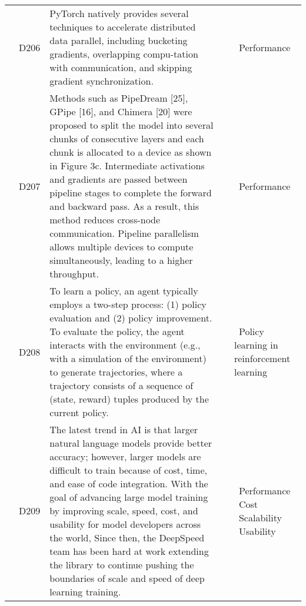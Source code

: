 {\begin{longtable}{|l|p{0.6cm}|p{11.8cm}|p{0.6cm}|p{2cm}|}
         & \label{D206}D206\newline\centering\cite{li_pytorch_2020} & PyTorch natively provides several techniques to accelerate distributed data parallel, including bucketing gradients, overlapping compu-tation with communication, and skipping gradient synchronization.
         & \cite{li_pytorch_2020,li_colossal-ai_2023,rasley_deepspeed_2020,shoeybi_megatron-lm_2020}
	     & \textbullet\ Performance \\ \cline{2-5}

         & \label{D207}D207\newline\centering\cite{li_colossal-ai_2023} & Methods such as PipeDream [25], GPipe [16], and Chimera [20] were proposed to split the model into several chunks of consecutive layers and each chunk is allocated to a device as shown in Figure 3c. Intermediate activations and gradients are passed between pipeline stages to complete the forward and backward pass. As a result, this method reduces cross-node communication. Pipeline parallelism allows multiple devices to compute simultaneously, leading to a higher throughput.
         & \cite{li_pytorch_2020,li_colossal-ai_2023,rasley_deepspeed_2020,shoeybi_megatron-lm_2020}
	     & \textbullet\ Performance \\ \cline{2-5}

         & \label{D208}D208\newline\centering\cite{moritz_ray_2018} & To learn a policy, an agent typically employs a two-step process: (1) policy evaluation and (2) policy improvement. To evaluate the policy, the agent interacts with the environment (e.g., with a simulation of the environment) to generate trajectories, where a trajectory consists of a sequence of (state, reward) tuples produced by the current policy.
         & \cite{moritz_ray_2018}
	     & \textbullet\ Policy learning in reinforcement learning \\ \cline{2-5}

         & \label{D209}D209\newline\centering\cite{rasley_deepspeed_2020} & The latest trend in AI is that larger natural language models provide better accuracy; however, larger models are difficult to train because of cost, time, and ease of code integration. With the goal of advancing large model training by improving scale, speed, cost, and usability for model developers across the world, Since then, the DeepSpeed team has been hard at work extending the library to continue pushing the boundaries of scale and speed of deep learning training.
         & \cite{rasley_deepspeed_2020,huang_gpipe_2019,shoeybi_megatron-lm_2020}
	     & \textbullet\ Performance \newline \textbullet\ Cost \newline \textbullet\ Scalability \newline \textbullet\ Usability \\ \cline{2-5}


\end{longtable}}
